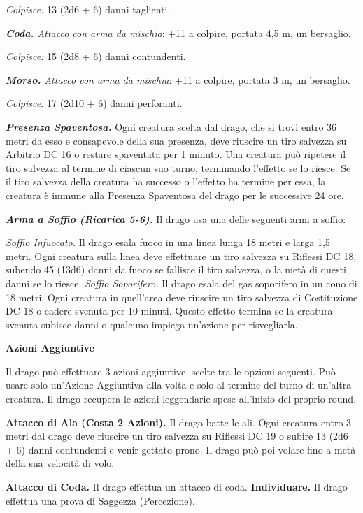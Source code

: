 \begin{multicols}{2}
\emph{Colpisce:} 13 (2d6 + 6) danni taglienti.

\emph{\textbf{Coda.} Attacco con arma da mischia}: +11 a colpire,
portata 4,5 m, un bersaglio.

\emph{Colpisce:} 15 (2d8 + 6) danni contundenti.

\emph{\textbf{Morso.} Attacco con arma da mischia}: +11 a colpire,
portata 3 m, un bersaglio.

\emph{Colpisce:} 17 (2d10 + 6) danni perforanti.

\emph{\textbf{Presenza Spaventosa.}} Ogni creatura scelta dal drago, che
si trovi entro 36 metri da esso e consapevole della sua presenza, deve
riuscire un tiro salvezza su Arbitrio DC 16 o restare spaventata per 1
minuto. Una creatura può ripetere il tiro salvezza al termine di ciascun
suo turno, terminando l'effetto se lo riesce. Se il tiro salvezza della
creatura ha successo o l'effetto ha termine per essa, la creatura è
immune alla Presenza Spaventosa del drago per le successive 24 ore.

\emph{\textbf{Arma a Soffio (Ricarica 5-6).}} Il drago usa una delle
seguenti armi a soffio:

\emph{Soffio Infuocato.} Il drago esala fuoco in una linea lunga 18
metri e larga 1,5 metri. Ogni creatura sulla linea deve effettuare un
tiro salvezza su Riflessi DC 18, subendo 45 (13d6) danni da fuoco se
fallisce il tiro salvezza, o la metà di questi danni se lo riesce.
\emph{Soffio Soporifero.} Il drago esala del gas soporifero in un cono
di 18 metri. Ogni creatura in quell'area deve riuscire un tiro salvezza
di Costituzione DC 18 o cadere svenuta per 10 minuti. Questo effetto
termina se la creatura svenuta subisce danni o qualcuno impiega
un'azione per risvegliarla.

\textbf{Azioni Aggiuntive}

Il drago può effettuare 3 azioni aggiuntive, scelte tra le opzioni
seguenti. Può usare solo un'Azione Aggiuntiva alla volta e solo al
termine del turno di un'altra creatura. Il drago recupera le azioni
leggendarie spese all'inizio del proprio round.

\textbf{Attacco di Ala (Costa 2 Azioni).} Il drago batte le ali. Ogni
creatura entro 3 metri dal drago deve riuscire un tiro salvezza su Riflessi DC 19 o subire 13 (2d6 + 6) danni contundenti e venir gettato
prono. Il drago può poi volare fino a metà della sua velocità di volo.

\textbf{Attacco di Coda.} Il drago effettua un attacco di coda.
\textbf{Individuare.} Il drago effettua una prova di Saggezza
(Percezione).




\end{multicols}
